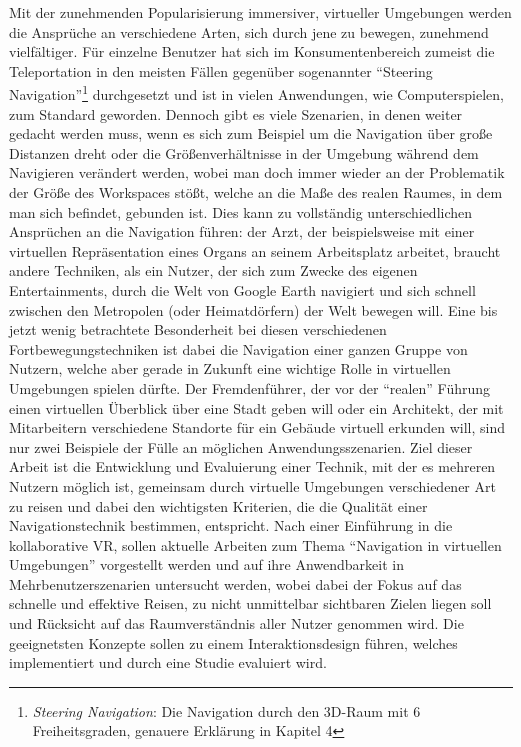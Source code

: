 Mit der zunehmenden Popularisierung immersiver, virtueller Umgebungen werden die Ansprüche an verschiedene Arten, sich durch jene zu bewegen, zunehmend vielfältiger.
Für einzelne Benutzer hat sich im Konsumentenbereich zumeist die Teleportation in den meisten Fällen gegenüber sogenannter “Steering Navigation”\footnote{\textit{Steering Navigation}: Die Navigation durch den 3D-Raum mit 6 Freiheitsgraden, genauere Erklärung in Kapitel 4} durchgesetzt und ist in vielen Anwendungen, wie Computerspielen, zum Standard geworden. 
Dennoch gibt es viele Szenarien, in denen weiter gedacht werden muss, wenn es sich zum Beispiel um die Navigation über große Distanzen dreht oder die Größenverhältnisse in der Umgebung während dem Navigieren verändert werden, wobei man doch immer wieder an der Problematik der Größe des Workspaces stößt, welche an die Maße des realen Raumes, in dem man sich befindet, gebunden ist.
Dies kann zu vollständig unterschiedlichen Ansprüchen an die Navigation führen: der Arzt, der  beispielsweise mit einer virtuellen Repräsentation eines Organs an seinem Arbeitsplatz arbeitet, braucht andere Techniken, als ein Nutzer, der sich zum Zwecke des eigenen Entertainments, durch die Welt von Google Earth navigiert und sich schnell zwischen den Metropolen (oder Heimatdörfern) der Welt bewegen will. Eine bis jetzt wenig betrachtete Besonderheit bei diesen verschiedenen Fortbewegungstechniken ist dabei die Navigation einer ganzen Gruppe von Nutzern, welche aber gerade in Zukunft eine wichtige Rolle in virtuellen Umgebungen spielen dürfte. Der Fremdenführer, der vor der “realen” Führung einen virtuellen Überblick über eine Stadt geben will oder ein Architekt, der mit Mitarbeitern verschiedene Standorte für ein Gebäude virtuell erkunden will, sind nur zwei Beispiele der Fülle an möglichen Anwendungsszenarien.
Ziel dieser Arbeit ist die Entwicklung und Evaluierung einer Technik, mit der es mehreren Nutzern möglich ist, gemeinsam durch virtuelle Umgebungen verschiedener Art zu reisen und dabei den wichtigsten Kriterien, die die Qualität einer Navigationstechnik bestimmen, entspricht. Nach einer Einführung in die kollaborative VR,  sollen aktuelle Arbeiten zum Thema “Navigation in virtuellen Umgebungen” vorgestellt werden und auf ihre Anwendbarkeit in Mehrbenutzerszenarien untersucht werden, wobei dabei der Fokus auf das schnelle und effektive Reisen, zu nicht unmittelbar sichtbaren Zielen liegen soll und Rücksicht auf das Raumverständnis aller Nutzer genommen wird.
Die geeignetsten Konzepte sollen zu einem Interaktionsdesign führen, welches implementiert und durch eine Studie evaluiert wird.

